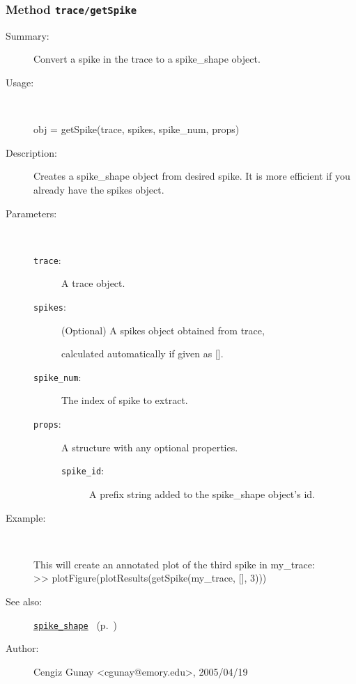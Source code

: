 \subsubsection[Method \texttt{getSpike}]{Method \texttt{trace/getSpike}}%
%
\label{ref_trace__getSpike}%
\hypertarget{ref_trace__getSpike}{}%
\begin{description}
\item[Summary:]Convert a spike in the trace to a spike\_shape object.
%
\item[Usage:]~%
\begin{lyxcode}%
obj = getSpike(trace, spikes, spike\_num, props)
%
\end{lyxcode}%
%
\item[Description:]%
Creates a spike\_shape object from desired spike. It is more efficient if
 you already have the spikes object.
\item[Parameters:]~
\begin{description}%
\item[\texttt{trace}:]
 A trace object.
\item[\texttt{spikes}:]
 (Optional) A spikes object obtained from trace, 

calculated automatically if given as [].\item[\texttt{spike\_num}:]
 The index of spike to extract.
\item[\texttt{props}:]
 A structure with any optional properties.
\begin{description}%
\item[\texttt{spike\_id}:]
 A prefix string added to the spike\_shape object's id.
\end{description}%
\end{description}%
%
%
\item[Example:]~
\begin{lyxcode} This will create an annotated plot of the third spike in my\_trace:\\%
 >> plotFigure(plotResults(getSpike(my\_trace, [], 3)))\\%
\end{lyxcode}
%
\item[See also:]%
\hyperlink{ref_spike_shape}{\texttt{spike\_shape}}%
\ (p.~\pageref{ref_spike_shape})%
%
%
\item[Author:]%
Cengiz Gunay <cgunay@emory.edu>, 2005/04/19%
\end{description}
\methodline%
